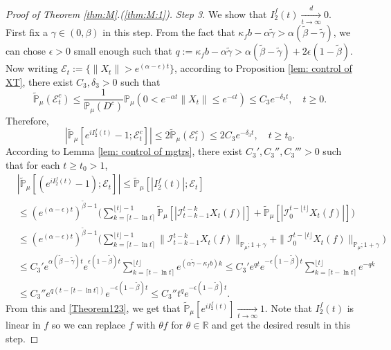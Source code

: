 \documentclass[12pt,a4paper]{amsart}
\theoremstyle{plain}
\theoremstyle{definition}
\numberwithin{equation}{section}
\begin{document}
\begin{proof}[Proof of Theorem \ref{thm:M}.(\ref{thm:M:1})]
  \emph{Step 3.}
  We show that $I^f_2(t)\xrightarrow[t\to \infty]{d} 0$.
  First fix a $\gamma \in (0,\beta)$ in this step.
  From the fact that $\kappa_f b -\alpha \tilde \gamma > \alpha (\tilde \beta - \tilde \gamma)$, we can chose $\epsilon >0$ small enough such that $q:=\kappa_fb- \alpha \tilde \gamma  > \alpha (\tilde \beta - \tilde \gamma) + 2\epsilon (1 - \tilde \beta)$.
  Now writing $\mathcal{E}_t:=\{\|X_t\|>e^{(\alpha-\epsilon) t}\}$, according to Proposition \ref{lem: control of XT}, there exist $C_3, \delta_3>0$ such that
  \begin{equation}
    \mathbb{\widetilde{P}}_{\mu}(\mathcal{E}^c_t)
    \leq \frac{1}{\mathbb{P}_{\mu}(D^c)}\mathbb{P}_{\mu}(0<e^{-\alpha t}\|X_t\|\leq e^{-\epsilon t})\leq C_3e^{-\delta_3 t}
    , \quad t\geq0.
  \end{equation}
  Therefore,
  \begin{equation}
    \label{Theorem123}
    |\mathbb{\widetilde{P}}_{\mu}[e^{i I^f_2(t)}-1;\mathcal{E}^c_t]|
    \leq 2\mathbb{\widetilde{P}}_{\mu}(\mathcal{E}^c_t)
    \leq 2C_3e^{-\delta_3 t},
    \quad t\geq t_0.
  \end{equation}
	According to Lemma \ref{lem: control of mgtrs}, there exist $C_3',C_3'',C_3'''>0$ such that for each $t\geq t_0 >1$,
  \begin{align}
    & |\mathbb{\widetilde{P}}_{\mu} [ (e^{i I^f_2(t)}-1);\mathcal{E}_t]|
      \leq  \mathbb{\widetilde{P}}_{\mu} [ |I^f_2(t)|;\mathcal{E}_t] \\
    & \leq  ( e^{(\alpha-\epsilon) t} )^{\tilde \beta - 1}\Big(\sum_{k=\lceil t-\ln t \rceil}^{\lfloor t \rfloor - 1}\mathbb{\widetilde{P}}_{\mu} [| \mathcal{I}_{t-k-1}^{t-k} X_t(f) |] + \mathbb{\widetilde{P}}_{\mu}[| \mathcal{I}_{0}^{t-\lfloor t\rfloor} X_t(f)|]\Big) \\
    & \leq ( e^{(\alpha-\epsilon) t} )^{\tilde \beta - 1}\Big(\sum_{k=\lceil t-\ln t \rceil}^{\lfloor t \rfloor - 1}\|\mathcal{I}_{t-k-1}^{t-k} X_t(f) \|_{\mathbb P_\mu; 1+\gamma} + \|\mathcal I_0^{t-\lfloor t \rfloor} X_t(f)\|_{\mathbb P_\mu;1+\gamma}\Big) \\
    & \leq C_3' e^{\alpha (\tilde \beta - \tilde \gamma)t} e ^{\epsilon (1-\tilde \beta) t}\sum_{k=\lceil t-\ln t \rceil}^{\lfloor t \rfloor}  e^{(\alpha\tilde \gamma-\kappa_f b)k}
      \leq C_3' e^{q t}e^{-\epsilon ( 1 - \tilde \beta)t}\sum_{k=\lceil t-\ln t \rceil}^{\lfloor t \rfloor}  e^{-q k}
\\
    & \leq C_3'' e^{q(t - \lceil t - \ln t\rceil)}e^{-\epsilon(1 - \tilde \beta) t}
\leq C_3'' t^q e^{- \epsilon(1 - \tilde \beta) t}.
  \end{align}
  From this and \eqref{Theorem123}, we get that $\widetilde {\mathbb P}_\mu[e^{i I^f_2(t)}] \xrightarrow[t\to \infty]{} 1$.
  Note that $I^f_2(t)$ is linear in $f$ so we can replace $f$ with $\theta f$ for $\theta \in \mathbb R$ and get the desired result in this step.


\end{proof}
\end{document}
